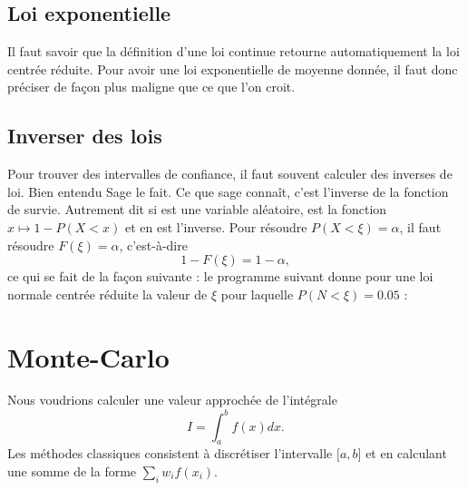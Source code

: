 \subsection{Loi exponentielle}

Il faut savoir que la définition d'une loi continue retourne automatiquement la loi centrée réduite. Pour avoir une loi exponentielle de moyenne donnée, il faut donc préciser de façon plus maligne que ce que l'on croit.



\subsection{Inverser des lois}

Pour trouver des intervalles de confiance, il faut souvent calculer des inverses de loi. Bien entendu Sage le fait. Ce que sage connaît, c'est l'inverse de la fonction de survie. Autrement dit si  est une variable aléatoire,  est la fonction \( x\mapsto 1-P(X<x)\) et  en est l'inverse. Pour résoudre \( P(X<\xi)=\alpha\), il faut résoudre \( F(\xi)=\alpha\), c'est-à-dire
\begin{equation}
	1-F(\xi)=1-\alpha,
\end{equation}
ce qui se fait de la façon suivante : le programme suivant donne pour une loi normale centrée réduite la valeur de \( \xi\) pour laquelle \( P(N<\xi)=0.05\) :


\section{Monte-Carlo}

Nous voudrions calculer une valeur approchée de l'intégrale
\begin{equation}
	I=\int_a^bf(x)dx.
\end{equation}
Les méthodes classiques consistent à discrétiser l'intervalle \( \mathopen[ a , b \mathclose]\) et en calculant une somme de la forme \( \sum_iw_if(x_i)\).

